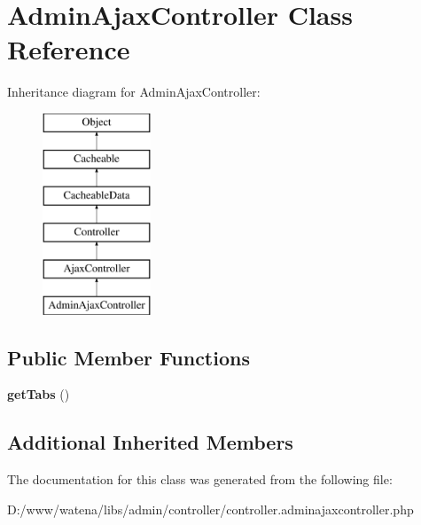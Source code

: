 \hypertarget{class_admin_ajax_controller}{\section{Admin\-Ajax\-Controller Class Reference}
\label{class_admin_ajax_controller}
}
Inheritance diagram for Admin\-Ajax\-Controller\-:\begin{figure}[H]
\begin{center}
\leavevmode
\includegraphics[height=6.000000cm]{class_admin_ajax_controller}
\end{center}
\end{figure}
\subsection*{Public Member Functions}
\begin{DoxyCompactItemize}
\item 
\hypertarget{class_admin_ajax_controller_ac89542be9dc9937e50bba11ee34ca3a9}{{\bfseries get\-Tabs} ()}\label{class_admin_ajax_controller_ac89542be9dc9937e50bba11ee34ca3a9}

\end{DoxyCompactItemize}
\subsection*{Additional Inherited Members}


The documentation for this class was generated from the following file\-:\begin{DoxyCompactItemize}
\item 
D\-:/www/watena/libs/admin/controller/controller.\-adminajaxcontroller.\-php\end{DoxyCompactItemize}
